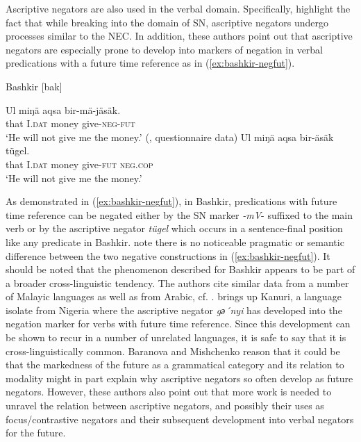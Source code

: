 \documentclass[output=paper,chinesefont,colorlinks,citecolor=brown]{langscibook}
\begin{document}
Ascriptive negators are also used in the verbal domain. Specifically,  highlight the fact that while breaking into the domain of SN, ascriptive negators undergo processes similar to the NEC. In addition, these authors point out that ascriptive negators are especially prone to develop into markers of negation in verbal predications with a future time reference as in (\ref{ex:bashkir-negfut}).

\newpage
\begin{exe}
\ex Bashkir [bak] \label{ex:bashkir-negfut}
\begin{xlist}
\ex \label{ex:bashkir-negfut-a}
\gll Ul miŋä aqsa bir-mä-jäsäk.\\
	that I.\textsc{dat} money give-\textsc{neg-fut}\\
	\glt `He will not give me the money.' (, questionnaire data)
  \ex \label{ex:bashkir-negfut-b}
	\gll Ul	miŋä aqsa bir-äsäk tügel.\\
	that I.\textsc{dat} money give-\textsc{fut} \textsc{neg.cop}\\
	\glt `He will not give me the money.' \citep[349]{say2017a}
\end{xlist}
\end{exe}
As demonstrated in (\ref{ex:bashkir-negfut}), in Bashkir, predications with future time reference can be negated either by the SN marker \textit{-mV}- suffixed to the main verb or by the ascriptive negator \textit{tügel} which occurs in a sentence-final position like any predicate in Bashkir.  note there is no noticeable pragmatic or semantic difference between the two negative constructions in (\ref{ex:bashkir-negfut}). It should be noted that the phenomenon described for Bashkir appears to be part of a broader cross-linguistic tendency. The authors cite similar data from a number of Malayic languages as well as from Arabic, cf. . \citet[172--173]{Veselinova2016} brings up Kanuri, a language isolate from Nigeria where the ascriptive negator \textit{gә´nyi} has developed into the negation marker for verbs with future time reference. Since this development can be shown to recur in a number of unrelated languages, it is safe to say that it is cross-linguistically common. Baranova and Mishchenko reason that it could be that the markedness of the future as a grammatical category and its relation to modality might in part explain why ascriptive negators so often develop as future negators. However, these authors also point out that more work is needed to unravel the relation between ascriptive negators, and possibly their uses as focus{\slash}contrastive negators and their subsequent development into verbal negators for the future.
\end{document}
